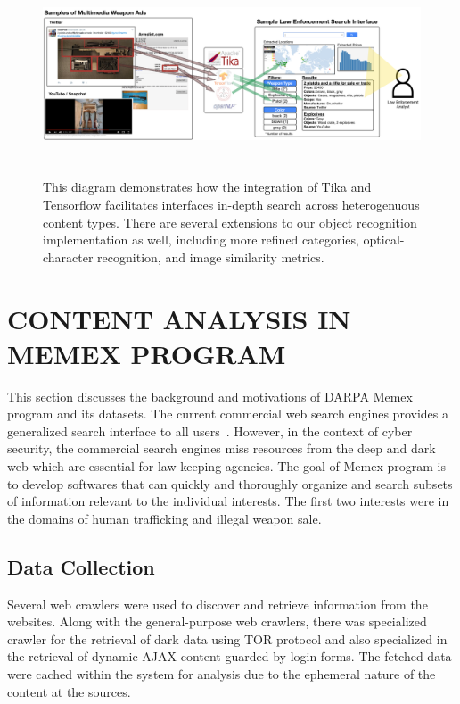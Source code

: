 \begin{figure}
	\includegraphics[width=\textwidth,height=6cm]{interface-diagram}
	\caption{This diagram demonstrates how the integration of Tika and Tensorflow facilitates interfaces in-depth search across heterogenuous content types. There are several extensions to our object recognition implementation as well, including more refined categories, optical-character recognition, and image similarity metrics.}
	\label{fig:interface-diagram}
\end{figure}

\section{CONTENT ANALYSIS IN MEMEX PROGRAM} \label{sec:memex}
This section discusses the background and motivations of DARPA Memex program and its datasets. The current commercial web search engines provides a generalized search interface to all users~\cite{}. However, in the context of cyber security, the commercial search engines miss resources from the deep and dark web which are essential for law keeping agencies. The goal of Memex program is to develop softwares that can quickly and thoroughly organize and search subsets of information relevant to the individual interests. The first two interests were in the domains of human trafficking and illegal weapon sale.

\subsection{Data Collection}
\label{sec:memex-datacollection}
Several web crawlers were used to discover and retrieve information from the websites.
Along with the general-purpose web crawlers, there was specialized crawler for the retrieval of dark data using TOR protocol \cite{} and also specialized in the retrieval of dynamic AJAX content guarded by login forms. The fetched data were cached within the system for analysis due to the ephemeral nature of the content at the sources.

